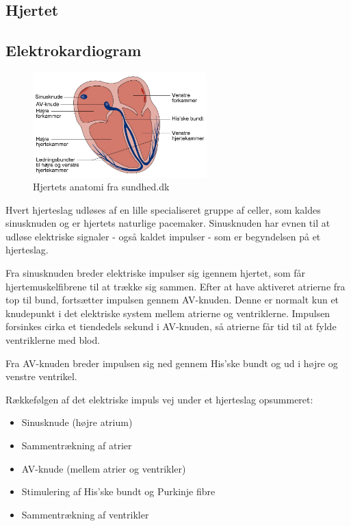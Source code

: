 \subsection{Hjertet}

\subsection{Elektrokardiogram}

\begin{figure}[H]
\centering
  \includegraphics[width=0.6\textwidth]{Billeder/hjerte.png}
   \caption{Hjertets anatomi fra sundhed.dk} 
   \label{fig:hjerte}
\end{figure}

Hvert hjerteslag udløses af en lille specialiseret gruppe af celler, som kaldes sinusknuden og er hjertets naturlige pacemaker. Sinusknuden har evnen til at udløse elektriske signaler - også kaldet impulser - som er begyndelsen på et hjerteslag. 

Fra sinusknuden breder elektriske impulser sig igennem hjertet, som får hjertemuskelfibrene til at trække sig sammen. Efter at have aktiveret atrierne fra top til bund, fortsætter impulsen gennem AV-knuden. Denne er normalt kun et knudepunkt i det elektriske system mellem atrierne og ventriklerne. Impulsen forsinkes cirka et tiendedels sekund i AV-knuden, så atrierne får tid til at fylde ventriklerne med blod. 

Fra AV-knuden breder impulsen sig ned gennem His'ske bundt og ud i højre og venstre ventrikel. 

Rækkefølgen af det elektriske impuls vej under et hjerteslag opsummeret:
\begin{itemize}
    \item Sinusknude (højre atrium)
    \item Sammentrækning af atrier
    \item AV-knude (mellem atrier og ventrikler)
    \item Stimulering af His'ske bundt og Purkinje fibre
    \item Sammentrækning af ventrikler
\end{itemize}

